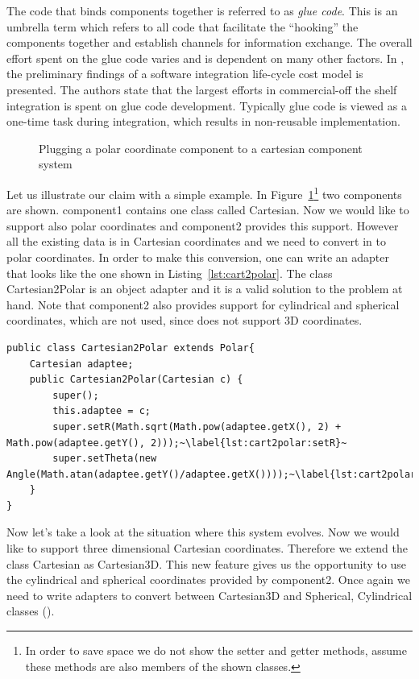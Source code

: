 \documentclass{llncs}
\begin{document}
The code that binds components together is referred to as \emph{glue code}. This is an umbrella term which refers to all code that facilitate the ``hooking'' the components together and establish channels for information exchange. The overall effort spent on the glue code varies and is dependent on many other factors. In \cite{abts2000cocots}, the preliminary findings of a software integration life-cycle cost model is presented. The authors state that the largest efforts in commercial-off the shelf integration is spent on glue code development. Typically glue code is viewed as a one-time task during integration, which results in non-reusable implementation.

\begin{figure}[h]
\centering

\caption{Plugging a polar coordinate component to a cartesian component system}%
\label{fig:cartesian}%
\end{figure}

Let us illustrate our claim with a simple example. In Figure~\ref{fig:cartesian}\footnote{In order to save space we do not show the setter and getter methods, assume these methods are also members of the shown classes.} two components are shown. \textsf{component1} contains one class called \textsf{Cartesian}. Now we would like to support also polar coordinates and \textsf{component2} provides this support. However all the existing data is in Cartesian coordinates and we need to convert in to polar coordinates. In order to make this conversion, one can write an adapter that looks like the one shown in Listing~\ref{lst:cart2polar}. The class \textsf{Cartesian2Polar} is an object adapter and it is a valid solution to the problem at hand. Note that \textsf{component2} also provides support for cylindrical and spherical coordinates, which are not used, since  does not support 3D coordinates. 

\begin{lstlisting}[float, caption={A Cartesian to polar adapter}, label={lst:cart2polar}]
public class Cartesian2Polar extends Polar{
	Cartesian adaptee;
	public Cartesian2Polar(Cartesian c) {
		super();
		this.adaptee = c;
		super.setR(Math.sqrt(Math.pow(adaptee.getX(), 2) + Math.pow(adaptee.getY(), 2)));~\label{lst:cart2polar:setR}~
		super.setTheta(new Angle(Math.atan(adaptee.getY()/adaptee.getX())));~\label{lst:cart2polar:setTheta}~
	}
}
\end{lstlisting}

Now let's take a look at the situation where this system evolves. Now we would like to support three dimensional Cartesian coordinates. Therefore we extend the class \textsf{Cartesian} as \textsf{Cartesian3D}. This new feature gives us the opportunity to use the cylindrical and spherical coordinates provided by \textsf{component2}. Once again we need to write adapters to convert between \textsf{Cartesian3D} and \textsf{Spherical, Cylindrical} classes (). 
\end{document}
